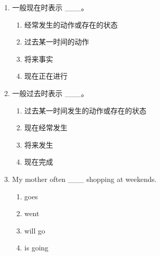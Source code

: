 \documentclass[11pt,a4paper]{ctexart}
\begin{document}
\begin{enumerate}[leftmargin=*,itemsep=4pt]
\begin{enumerate}[label=\Alph*.,leftmargin=2em,itemsep=1pt,topsep=2pt]
\item are enjoying
\end{enumerate}
\item 一般现在时表示 \_\_\_。
\begin{enumerate}[label=\Alph*.,leftmargin=2em,itemsep=1pt,topsep=2pt]
\item 经常发生的动作或存在的状态
\item 过去某一时间的动作
\item 将来事实
\item 现在正在进行
\end{enumerate}
\item 一般过去时表示 \_\_\_。
\begin{enumerate}[label=\Alph*.,leftmargin=2em,itemsep=1pt,topsep=2pt]
\item 过去某一时间发生的动作或存在的状态
\item 现在经常发生
\item 将来发生
\item 现在完成
\end{enumerate}
\item My mother often \_\_\_ shopping at weekends.
\begin{enumerate}[label=\Alph*.,leftmargin=2em,itemsep=1pt,topsep=2pt]
\item goes
\item went
\item will go
\item is going
\end{enumerate}
\end{enumerate}
\end{document}
